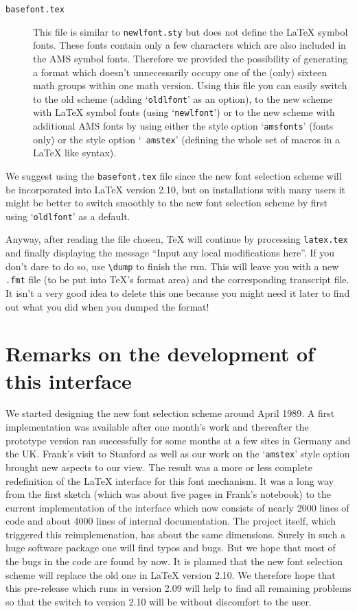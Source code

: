 \begin{description}
  \item[\tt basefont.tex]
    This file is similar to {\tt newlfont.sty} but does not define the
     \LaTeX{} symbol fonts. These fonts contain only a few characters
     which are also included in the AMS symbol fonts.  Therefore we
     provided the possibility of generating a format which doesn't
     unnecessarily occupy one of the (only) sixteen math groups within
     one math version. Using this file you can easily switch to the
     old scheme (adding `{\tt oldlfont}' as an option), to the new
     scheme with \LaTeX{} symbol fonts (using `{\tt newlfont}') or to
     the new scheme with additional AMS fonts by using either the
     style option `{\tt amsfonts}' (fonts only) or the style option `{\tt
     amstex}' (defining the whole set of \AmSTeX{} macros in a \LaTeX{}
     like syntax).
 \end{description}
We suggest using the {\tt basefont.tex} file since the new font
 selection scheme will be incorporated into \LaTeX{} version 2.10, but
 on installations with many users it might be better to switch
 smoothly to the new font
 selection scheme by first using `{\tt oldlfont}' as a default.

Anyway, after reading the file chosen, \TeX{} will continue by
 processing {\tt latex.tex} and finally displaying the message ``Input
 any local modifications here''.  If you don't dare to do so, use
 \verb+\dump+ to finish the run.  This will leave you with a new {\tt
 .fmt} file (to be put into \TeX's format area) and the corresponding
 transcript file.  It isn't a very good idea to delete this one
 because you might need it later to find out what you did when you
 dumped the format!


 \section{Remarks on the development of this interface}

 We started designing the new font selection scheme around April 1989.
 A first implementation was available after one month's work and
 thereafter the prototype version ran successfully for some months at
 a few sites in Germany and the UK\null. Frank's visit to Stanford as
 well as our work on the `{\tt amstex}' style option brought new
 aspects to our view. The result was a more or less complete
 redefinition of the \LaTeX{} interface for this font mechanism.  It
 was a long way from the first sketch (which was about five pages in
 Frank's notebook) to the current implementation of the interface
 which now consists of nearly 2000 lines of code and about 4000 lines
 of internal documentation. The \AmSTeX{} project itself, which
 triggered this reimplemenation, has about the same dimensions. Surely
 in such a huge software package one will find typos and bugs. But we
 hope that most of the bugs in the code are found by now. It is
 planned that the new font selection scheme will replace the old one
 in \LaTeX{} version 2.10.  We therefore hope that this pre-release
 which runs in version 2.09 will help to find all remaining problems
 so that the switch to version 2.10 will be without discomfort to the
 user.

